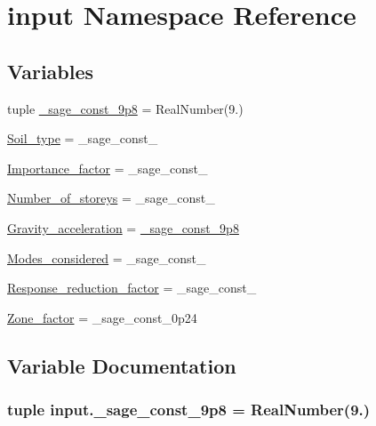 \hypertarget{namespaceinput}{}\section{input Namespace Reference}
\label{namespaceinput}
\subsection*{Variables}
\begin{DoxyCompactItemize}
\item 
tuple \hyperlink{namespaceinput_ac1b86705df1981fd4962cc056fb0608a}{\+\_\+sage\+\_\+const\+\_\+9p8} = Real\+Number(\textquotesingle{}9.\textquotesingle{})
\item 
\hyperlink{namespaceinput_a6221ae01cf2fb9e8cd22204749785a0e}{Soil\+\_\+type} = \+\_\+sage\+\_\+const\+\_
\item 
\hyperlink{namespaceinput_a0840d963ea24db338f3ab4457defb494}{Importance\+\_\+factor} = \+\_\+sage\+\_\+const\+\_
\item 
\hyperlink{namespaceinput_a10237b312ba44e8c8090db86059c5803}{Number\+\_\+of\+\_\+storeys} = \+\_\+sage\+\_\+const\+\_
\item 
\hyperlink{namespaceinput_a55ab15c1c171513e99332aa50c723764}{Gravity\+\_\+acceleration} = \hyperlink{namespaceinput_ac1b86705df1981fd4962cc056fb0608a}{\+\_\+sage\+\_\+const\+\_\+9p8}
\item 
\hyperlink{namespaceinput_adb7aca4735796aaa4a46456d3edeac2e}{Modes\+\_\+considered} = \+\_\+sage\+\_\+const\+\_
\item 
\hyperlink{namespaceinput_aa6d0078a6d934c0d515d85059525e938}{Response\+\_\+reduction\+\_\+factor} = \+\_\+sage\+\_\+const\+\_
\item 
\hyperlink{namespaceinput_aeea70e58ec9bb0d3d6c4363867eb0f82}{Zone\+\_\+factor} = \+\_\+sage\+\_\+const\+\_\+0p24
\end{DoxyCompactItemize}


\subsection{Variable Documentation}
\hypertarget{namespaceinput_ac1b86705df1981fd4962cc056fb0608a}{}
\subsubsection[{\+\_\+sage\+\_\+const\+\_\+9p8}]{\setlength{\rightskip}{0pt plus 5cm}tuple input.\+\_\+sage\+\_\+const\+\_\+9p8 = Real\+Number(\textquotesingle{}9.\textquotesingle{})}\label{namespaceinput_ac1b86705df1981fd4962cc056fb0608a}


